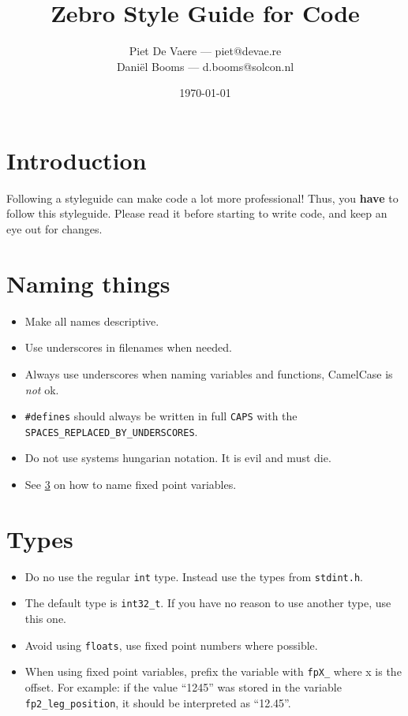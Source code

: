 \documentclass[11pt,a4paper]{article}
\title{Zebro Style Guide for Code}
\author{Piet De Vaere --- piet@devae.re\\ Dani\"el Booms --- d.booms@solcon.nl}
\date{\today}
\begin{document}
\maketitle
\tableofcontents

\section{Introduction}
Following a styleguide can make code a lot more professional! Thus, you \textbf{have} to follow this styleguide.
Please read it before starting to write code, and keep an eye out for changes.

\section{Naming things}
\begin{itemize}
\item Make all names descriptive.
\item Use underscores in filenames when needed.
\item Always use underscores when naming variables and functions, CamelCase is \emph{not} ok.
\item \verb|#defines| should always be written in full \verb|CAPS| with the \verb|SPACES_REPLACED_BY_UNDERSCORES|.
\item Do not use systems hungarian notation. It is evil and must die.
\item See \cref{sec:types} on how to name fixed point variables.
\end{itemize}

\section{Types}\label{sec:types}
\begin{itemize}
\item Do no use the regular \verb|int| type. Instead use the types from \verb|stdint.h|.
\item The default type is \verb|int32_t|. If you have no reason to use another type, use this one.
\item Avoid using \verb|floats|, use fixed point numbers where possible.
\item When using fixed point variables, prefix the variable with \verb|fpX_| where x is the offset.
    For example: if the value ``1245'' was stored in the variable \verb|fp2_leg_position|, it should be interpreted as
    ``12.45''.
\end{itemize}
\end{document}
